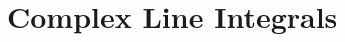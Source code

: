 \documentclass[../../script.tex]{subfiles}
\begin{document}
\section{Complex Line Integrals}
\end{document}
